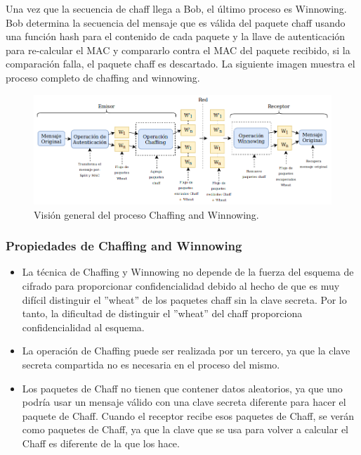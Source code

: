 \documentclass[12pt, a4paper, titlepage]{article}
\begin{document}
		Una vez que la secuencia de chaff llega a Bob, el último proceso es Winnowing. Bob determina la secuencia del mensaje que es válida del paquete chaff usando una función hash para el contenido de cada paquete y la llave de autenticación para re-calcular el MAC y compararlo contra el MAC del paquete recibido, si la comparación falla, el paquete chaff es descartado. 
		La siguiente imagen muestra el proceso completo de chaffing and winnowing.
		
		\begin{figure}[H]
			\begin{center}	                  \includegraphics[width=14cm]{./imagenes/chaff_winn.png}
				\caption{Visión general del proceso Chaffing and Winnowing.}
			\end{center}
		\end{figure}
		
		\subsubsection{Propiedades de Chaffing and Winnowing}
		\begin{itemize}
		    \item La técnica de Chaffing y Winnowing no depende de la fuerza del esquema de cifrado para proporcionar confidencialidad debido al hecho de que es muy difícil distinguir el ''wheat'' de los paquetes chaff sin la clave secreta. Por lo tanto, la dificultad de distinguir el ''wheat'' del chaff proporciona confidencialidad al esquema.
		    \item La operación de Chaffing puede ser realizada por un tercero, ya que la clave secreta compartida no es necesaria en el proceso del mismo.
		    \item Los paquetes de Chaff no tienen que contener datos aleatorios, ya que uno podría usar un mensaje válido con una clave secreta diferente para hacer el paquete de Chaff. Cuando el receptor recibe esos paquetes de Chaff, se verán como paquetes de Chaff, ya que la clave que se usa para volver a calcular el Chaff es diferente de la que los hace.
		\end{itemize}
        
\end{document}
